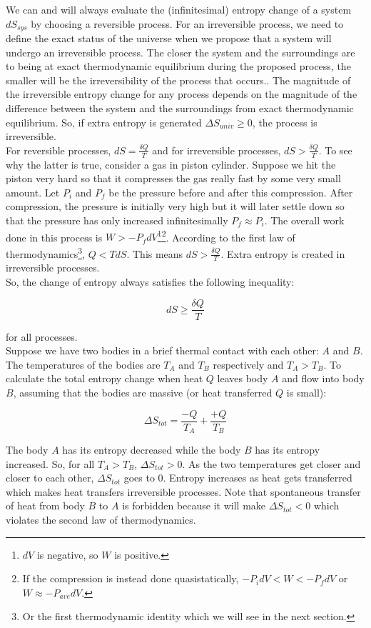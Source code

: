 We can and will always evaluate the (infinitesimal) entropy change of a system $dS_{sys}$ by choosing a reversible process. For an irreversible process, we need to define the exact status of the universe when we propose that a system will undergo an irreversible process. The closer the system and the surroundings are to being at exact thermodynamic equilibrium during the proposed process, the smaller will be the irreversibility of the process that occurs.. The magnitude of the irreversible entropy change for any process depends on the magnitude of the difference between the system and the surroundings from exact thermodynamic equilibrium. So, if extra entropy is generated $\Delta S_{univ}\ge0$, the process is irreversible. \\

For reversible processes, $dS=\frac{\delta Q}{T}$ and for irreversible processes, $dS>\frac{\delta Q}{T}$. To see why the latter is true, consider a gas in piston cylinder. Suppose we hit the piston very hard so that it compresses the gas really fast by some very small amount. Let $P_i$ and $P_f$ be the pressure before and after this compression. After compression, the pressure is initially very high but it will later settle down so that the pressure has only increased infinitesimally $P_f\approx P_i$. The overall work done in this process is $W>-P_fdV$\footnote{$dV$ is negative, so $W$ is positive.}\footnote{If the compression is instead done quasistatically, $-P_idV<W<-P_fdV$ or $W\approx -P_{ave}dV$.}. According to the first law of thermodynamics\footnote{Or the first thermodynamic identity which we will see in the next section.}, $Q<TdS$. This means $dS>\frac{\delta Q}{T}$. Extra entropy is created in irreversible processes. \\

So, the change of entropy always satisfies the following inequality:

\[dS \geq \frac{\delta Q}{T}\]

for all processes. \\

Suppose we have two bodies in a brief thermal contact with each other: $A$ and $B$. The temperatures of the bodies are $T_A$ and $T_B$ respectively and $T_A>T_B$. To calculate the total entropy change when heat $Q$ leaves body $A$ and flow into body $B$, assuming that the bodies are massive (or heat transferred $Q$ is small):

\[\Delta S_{tot}=\frac{-Q}{T_A}+\frac{+Q}{T_B}\]

The body $A$ has its entropy decreased while the body $B$ has its entropy increased. So, for all $T_A>T_B$, $\Delta S_{tot}>0$. As the two temperatures get closer and closer to each other, $\Delta S_{tot}$ goes to $0$. Entropy increases as heat gets transferred which makes heat transfers irreversible processes. Note that spontaneous transfer of heat from body $B$ to $A$ is forbidden because it will make $\Delta S_{tot}<0$ which violates the second law of thermodynamics.


